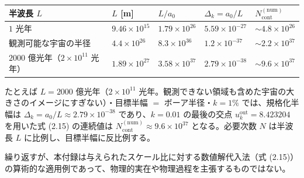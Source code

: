 \documentclass[
]{ltjsarticle}
\newcounter{none} %
\begin{document}
{\def\LTcaptype{none} %
\begin{longtable}[]{@{}
  >{\raggedright\arraybackslash}p{}
  >{\raggedleft\arraybackslash}p{}
  >{\raggedleft\arraybackslash}p{}
  >{\raggedleft\arraybackslash}p{}
  >{\raggedleft\arraybackslash}p{}@{}}
\toprule\noalign{}
\begin{minipage}[b]{\linewidth}\raggedright
半波長 \(L\)
\end{minipage} & \begin{minipage}[b]{\linewidth}\raggedleft
\(L\) {[}m{]}
\end{minipage} & \begin{minipage}[b]{\linewidth}\raggedleft
\(L/a_0\)
\end{minipage} & \begin{minipage}[b]{\linewidth}\raggedleft
\(\Delta_k=a_0/L\)
\end{minipage} & \begin{minipage}[b]{\linewidth}\raggedleft
\(N_{\mathrm{cont}}^{(\mathrm{num})}\)
\end{minipage} \\
\midrule\noalign{}
\endhead
\bottomrule\noalign{}
\endlastfoot
\(1\) 光年 & \(9.46\times10^{15}\) & \(1.79\times10^{26}\) &
\(5.59\times10^{-27}\) & \(\sim 4.8\times10^{26}\) \\
観測可能な宇宙の半径 & \(4.4\times10^{26}\) & \(8.3\times10^{36}\) &
\(1.2\times10^{-37}\) & \(\sim 2.2\times10^{37}\) \\
\(2000\) 億光年（\(2\times10^{11}\) 光年） & \(1.89\times10^{27}\) &
\(3.58\times10^{37}\) & \(2.79\times10^{-38}\) &
\(\sim 9.6\times10^{37}\) \\
\end{longtable}
}

たとえば \(L=2000\) 億光年（\(2\times10^{11}\)
光年。観測できない領域も含めた宇宙の大きさのイメージにすぎない）・目標半幅
\(=\) ボーア半径・\(k=1\%\) では、規格化半幅は
\(\Delta_k=a_0/L\approx2.79\times10^{-38}\) であり、\(k=0.01\)
の最後の交点 \(u_k^{\mathrm{out}}=8.423204\) を用いた式 (2.15)
の連続値は \(N_{\mathrm{cont}}^{(\mathrm{num})}\approx9.6\times10^{37}\)
となる。必要次数 \(N\) は半波長 \(L\) に比例し、目標半幅に反比例する。

繰り返すが、本付録は与えられたスケール比に対する数値解代入法（式
(2.15)）の算術的な適用例であって、物理的実在や物理過程を主張するものではない。
\end{document}
